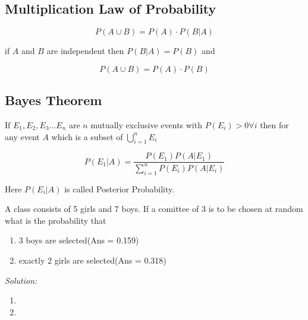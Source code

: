 \documentclass[11pt,letterpaper]{article}
\newenvironment{problem}[2][Problem]                                  
        {\begin{tcolorbox}[colback=white,colframe=gray!50,title=#1 #2]}
        {\end{tcolorbox}}
\newenvironment{solution}                      
        {\begin{mdframed}\textit{Solution:} \\}
        {\end{mdframed}}
\begin{document}
\subsection{Multiplication Law of Probability}
\[
  P(A\cup B) = P(A) \cdot P( B \vert A )
\]

if $A$ and $B$ are independent then $ P( B \vert A ) = P(B)$ and 

\[
  P(A\cup B) = P(A) \cdot P( B )
\]

\subsection{Bayes Theorem}
If $E_1, E_2, E_3 \dots E_n$ are $n$ mutually exclusive events with $P(E_i) > 0 \forall i$ then for any event $A$ 
which is a subset of $\bigcup_{i=1}^n E_i$ 

\[
  P(E_1 \vert A) = \frac{P(E_1) P(A \vert E_1)}{\sum_{i=1}^n{P(E_i) P(A \vert E_i)}}
\]

Here $P(E_i \vert A)$ is called Posterior Probability.

\begin{problem}8
  A class consists of 5 girls and 7 boys. If a comittee of 3 is to be chosen at random what is the probability that 
  \begin{enumerate}
    \item 3 boys are selected\hfill (Ans = 0.159)
    \item exactly 2 girls are selected\hfill (Ans = 0.318)
  \end{enumerate}
\end{problem}
\begin{solution}
  \begin{enumerate}
    \item 
    \item 
  \end{enumerate}
\end{solution}
\end{document}
